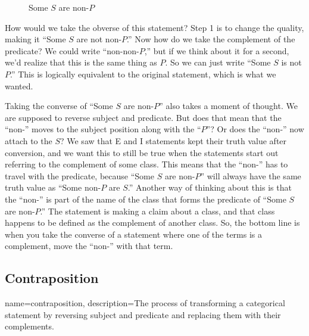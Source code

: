 \begin{figure}[H]
\begin{center}
\captionsetup{singlelinecheck=on}
\caption*{Some $S$ are non-$P$}
\end{center} 
\end{figure}

How would we take the obverse of this statement? Step 1 is to change the quality, making it ``Some $S$ are not non-$P$.'' Now how do we take the complement of the predicate? We could write ``non-non-$P$,'' but if we think about it for a second, we'd realize that this is the same thing as $P$. So we can just write ``Some $S$ is not $P$.'' This is logically equivalent to the original statement, which is what we wanted.   

Taking the converse of ``Some $S$ are non-$P$'' also takes a moment of thought. We are supposed to reverse subject and predicate. But does that mean that the ``non-'' moves to the subject position along with the ``$P$''? Or does the ``non-'' now attach to the $S$? We saw that E and I statements kept their truth value after conversion, and we want this to still be true when the statements start out referring to the complement of some class. This means that the ``non-'' has to travel with the predicate, because ``Some $S$ are non-$P$'' will always have the same truth value as ``Some non-$P$ are $S$.'' Another way of thinking about this is that the ``non-'' is part of the name of the class that forms the predicate of ``Some $S$ are non-$P$.'' The statement is making a claim about a class, and that class happens to be defined as the complement of another class. So, the bottom line is when you take the converse of a statement where one of the terms is a complement, move the ``non-'' with that term. 

\subsection{Contraposition}

{
name=contraposition,
description={The process of transforming a categorical statement by reversing subject and predicate and replacing them with their complements.}
}


